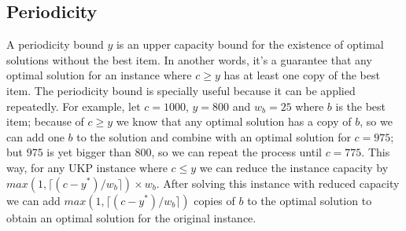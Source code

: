 \documentclass[runningheads,a4paper]{llncs}
\begin{document}




\subsection{Periodicity}

A periodicity bound \(y\) is an upper capacity bound for the existence of optimal solutions without the best item. 
In another words, it's a guarantee that any optimal solution for an instance where \(c \geq y\) has at least one copy of the best item. 
The periodicity bound is specially useful because it can be applied repeatedly. 
For example, let \(c = 1000\), \(y = 800\) and \(w_b = 25\) where \(b\) is the best item; because of \(c \geq y\) we know that any optimal solution has a copy of \(b\), so we can add one \(b\) to the solution and combine with an optimal solution for \(c = 975\); but \(975\) is yet bigger than \(800\), so we can repeat the process until \(c = 775\). 
This way, for any UKP instance where \(c \leq y\) we can reduce the instance capacity by \(max(1, \lceil(c-y^{*})/w_b\rceil)\times w_b\). After solving this instance with reduced capacity we can add \(max(1, \lceil(c-y^{*})/w_b\rceil)\) copies of \(b\) to the optimal solution to obtain an optimal solution for the original instance.
\end{document}
